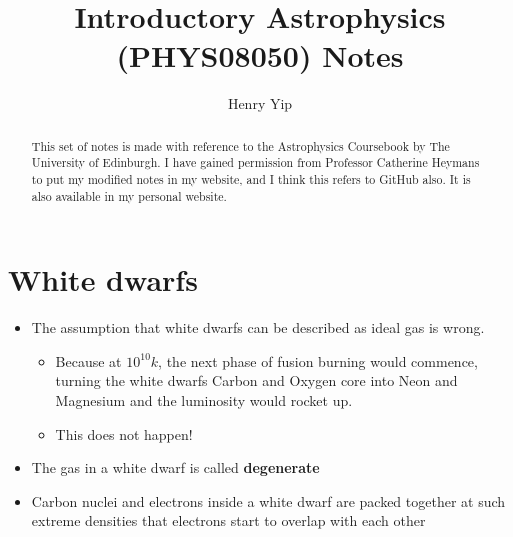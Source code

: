 \documentclass{article}
\title{Introductory Astrophysics (PHYS08050) Notes}
\author{Henry Yip}
\begin{document}
\maketitle
\begin{abstract}
This set of notes is made with reference to the Astrophysics Coursebook by The University of Edinburgh. I have gained permission from Professor Catherine Heymans to put my modified notes in my website, and I think this refers to GitHub also. It is also available in my personal website.
\end{abstract}
\section{White dwarfs}
\begin{itemize}
    \item The assumption that white dwarfs can be described as ideal gas is wrong.
    \begin{itemize}
        \item Because at $10^10k$, the next phase of fusion burning would commence, turning the white dwarfs Carbon and Oxygen core into Neon and Magnesium and the luminosity would rocket up.
       \item This does not happen!
    \end{itemize}
    \item  The gas in a white dwarf is called 
    \textbf{degenerate}
    \item Carbon nuclei and electrons inside a white dwarf are packed together at such extreme densities that electrons start to overlap with each other
\end{itemize}
\end{document}
